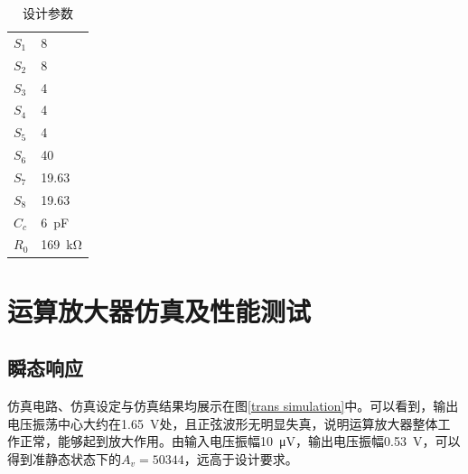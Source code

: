 \documentclass[UTF8]{ctexart}
\numberwithin{figure}{subsection}
\numberwithin{table}{subsection}
\numberwithin{equation}{subsection}
\begin{document}
\begin{table}[!ht]
    \centering 
    \begin{tabular}{l l}
    \toprule
        $S_1$ & 8\\ 
        $S_2$ & 8\\ 
        $S_3$ & 4\\ 
        $S_4$ & 4\\ 
        $S_5$ & 4\\ 
        $S_6$ & 40\\ 
        $S_7$ & 19.63\\
        $S_8$ & 19.63\\
        $C_c$ & \SI[]{6}{\pico\farad}\\
        $R_0$ & \SI[]{169}{\kilo\ohm}\\
    \bottomrule
    \end{tabular}
    \caption{设计参数}
    \label{design parameters}
\end{table}

\section{运算放大器仿真及性能测试}

\subsection{瞬态响应}
仿真电路、仿真设定与仿真结果均展示在图\ref{trans simulation}中。可以看到，输出电压振荡中心大约在\SI{1.65}{\volt}处，且正弦波形无明显失真，说明运算放大器整体工作正常，能够起到放大作用。由输入电压振幅\SI[]{10}{\micro\volt}，输出电压振幅\SI[]{0.53}{\volt}，可以得到准静态状态下的\(A_v = 50344\)，远高于设计要求。
\end{document}
